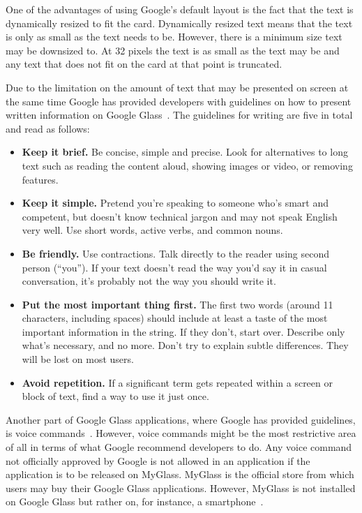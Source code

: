 One of the advantages of using Google's default layout is the fact that the text is dynamically resized to fit the card. Dynamically resized text means that the text is only as small as the text needs to be. However, there is a minimum size text may be downsized to. At 32 pixels the text is as small as the text may be and any text that does not fit on the card at that point is truncated.

Due to the limitation on the amount of text that may be presented on screen at the same time Google has provided developers with guidelines on how to present written information on Google Glass~\cite{glassDesignStyle}. The guidelines for writing are five in total and read as follows:

\newpage
\begin{itemize}
	\item \textbf{Keep it brief.} Be concise, simple and precise. Look for alternatives to long text such as reading the content aloud, showing images or video, or removing features.
	\item \textbf{Keep it simple.} Pretend you're speaking to someone who's smart and competent, but doesn't know technical jargon and may not speak English very well. Use short words, active verbs, and common nouns.
	\item \textbf{Be friendly.} Use contractions. Talk directly to the reader using second person (``you''). If your text doesn't read the way you'd say it in casual conversation, it's probably not the way you should write it.
	\item \textbf{Put the most important thing first.} The first two words (around 11 characters, including spaces) should include at least a taste of the most important information in the string. If they don't, start over. Describe only what's necessary, and no more. Don't try to explain subtle differences. They will be lost on most users.
	\item \textbf{Avoid repetition.} If a significant term gets repeated within a screen or block of text, find a way to use it just once.
\end{itemize}

Another part of Google Glass applications, where Google has provided guidelines, is voice commands~\cite{googleGlassVoiceCommand}. However, voice commands might be the most restrictive area of all in terms of what Google recommend developers to do. Any voice command not officially approved by Google is not allowed in an application if the application is to be released on MyGlass. MyGlass is the official store from which users may buy their Google Glass applications. However, MyGlass is not installed on Google Glass but rather on, for instance, a smartphone~\cite{myGlass}.

